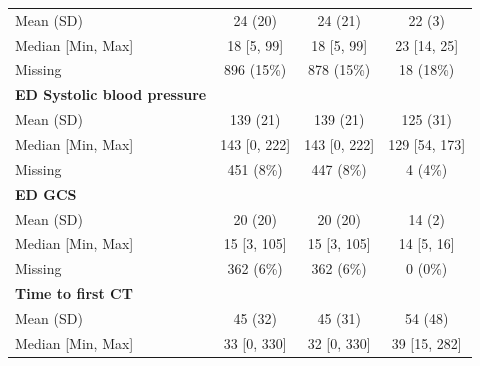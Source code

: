 \documentclass[12pt, a4paper]{article}
\begin{document}
\begin{appendices}
\begin{table}[t!]
{\begin{tabular}{lccc}
                \hspace{3mm}Mean (SD)                         & 24 (20)           & 24 (21)           & 22 (3)        \\
                \hspace{3mm}Median [Min, Max]                 & 18 [5, 99]        & 18 [5, 99]        & 23 [14, 25]   \\
                \hspace{3mm}Missing                           & 896 (15\%)        & 878 (15\%)        & 18 (18\%)     \\
                \textbf{ED Systolic blood pressure}           &                   &                   &               \\
                \hspace{3mm}Mean (SD)                         & 139 (21)          & 139 (21)          & 125 (31)      \\
                \hspace{3mm}Median [Min, Max]                 & 143 [0, 222]      & 143 [0, 222]      & 129 [54, 173] \\
                \hspace{3mm}Missing                           & 451 (8\%)         & 447 (8\%)         & 4 (4\%)       \\
                \textbf{ED GCS}                               &                   &                   &               \\
                \hspace{3mm}Mean (SD)                         & 20 (20)           & 20 (20)           & 14 (2)        \\
                \hspace{3mm}Median [Min, Max]                 & 15 [3, 105]       & 15 [3, 105]       & 14 [5, 16]    \\
                \hspace{3mm}Missing                           & 362 (6\%)         & 362 (6\%)         & 0 (0\%)       \\
                \textbf{Time to first CT}                     &                   &                   &               \\
                \hspace{3mm}Mean (SD)                         & 45 (32)           & 45 (31)           & 54 (48)       \\
                \hspace{3mm}Median [Min, Max]                 & 33 [0, 330]       & 32 [0, 330]       & 39 [15, 282]  \\

\end{tabular}}
\end{table}
\end{appendices}
\end{document}
